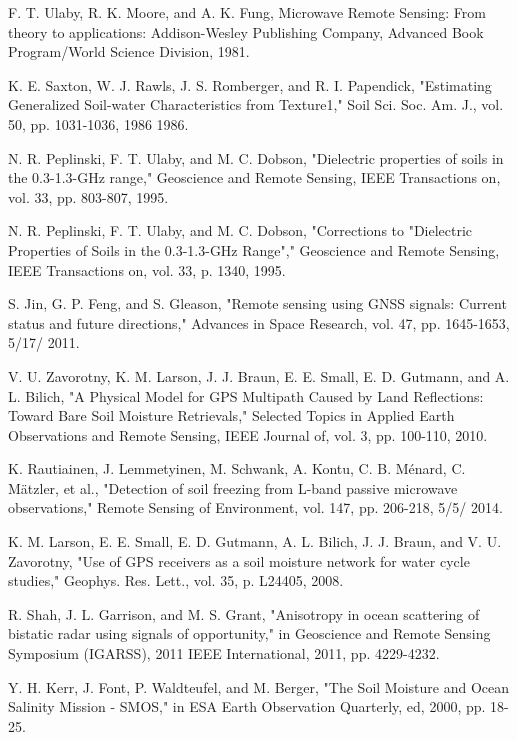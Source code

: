 \documentclass[draftcls,onecolumn]{IEEEtran}  %
\begin{document}
\begin{thebibliography}{1}

F. T. Ulaby, R. K. Moore, and A. K. Fung, Microwave Remote Sensing: From theory to applications: Addison-Wesley Publishing Company, Advanced Book Program/World Science Division, 1981.

K. E. Saxton, W. J. Rawls, J. S. Romberger, and R. I. Papendick, "Estimating Generalized Soil-water Characteristics from Texture1," Soil Sci. Soc. Am. J., vol. 50, pp. 1031-1036, 1986 1986.

N. R. Peplinski, F. T. Ulaby, and M. C. Dobson, "Dielectric properties of soils in the 0.3-1.3-GHz range," Geoscience and Remote Sensing, IEEE Transactions on, vol. 33, pp. 803-807, 1995.

N. R. Peplinski, F. T. Ulaby, and M. C. Dobson, "Corrections to "Dielectric Properties of Soils in the 0.3-1.3-GHz Range"," Geoscience and Remote Sensing, IEEE Transactions on, vol. 33, p. 1340, 1995.

S. Jin, G. P. Feng, and S. Gleason, "Remote sensing using GNSS signals: Current status and future directions," Advances in Space Research, vol. 47, pp. 1645-1653, 5/17/ 2011.

V. U. Zavorotny, K. M. Larson, J. J. Braun, E. E. Small, E. D. Gutmann, and A. L. Bilich, "A Physical Model for GPS Multipath Caused by Land Reflections: Toward Bare Soil Moisture Retrievals," Selected Topics in Applied Earth Observations and Remote Sensing, IEEE Journal of, vol. 3, pp. 100-110, 2010.

K. Rautiainen, J. Lemmetyinen, M. Schwank, A. Kontu, C. B. Ménard, C. Mätzler, et al., "Detection of soil freezing from L-band passive microwave observations," Remote Sensing of Environment, vol. 147, pp. 206-218, 5/5/ 2014.

K. M. Larson, E. E. Small, E. D. Gutmann, A. L. Bilich, J. J. Braun, and V. U. Zavorotny, "Use of GPS receivers as a soil moisture network for water cycle studies," Geophys. Res. Lett., vol. 35, p. L24405, 2008.

R. Shah, J. L. Garrison, and M. S. Grant, "Anisotropy in ocean scattering of bistatic radar using signals of opportunity," in Geoscience and Remote Sensing Symposium (IGARSS), 2011 IEEE International, 2011, pp. 4229-4232.

Y. H. Kerr, J. Font, P. Waldteufel, and M. Berger, "The Soil Moisture and Ocean Salinity Mission - SMOS," in ESA Earth Observation Quarterly, ed, 2000, pp. 18-25.


\end{thebibliography}
\end{document}

